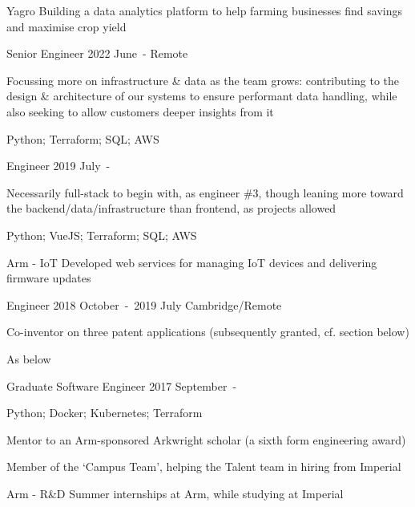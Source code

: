 \begin{cventries}

\cventryjob
  {Yagro}
  {Building a data analytics platform to help farming businesses find savings and maximise crop yield}

\cventryrole
  {Senior Engineer}
  {2022 June~-}
  {Remote}
  {\begin{cvitems}
    \item {Focussing more on infrastructure \& data as the team grows: contributing to the design \& architecture of our systems to ensure performant data handling, while also seeking to allow customers deeper insights from it}
    \item {Python; Terraform; SQL; AWS}
  \end{cvitems}}

\cventryrole
  {Engineer}
  {2019 July~-}
  {}
  {\begin{cvitems}
    \item {Necessarily full-stack to begin with, as engineer \#3, though leaning more toward the backend/data/infrastructure than frontend, as projects allowed}
    \item {Python; VueJS; Terraform; SQL; AWS}
  \end{cvitems}}

\cventryjob
  {Arm - IoT}
  {Developed web services for managing IoT devices and delivering firmware updates}

\cventryrole
  {Engineer}
  {2018 October~-~2019 July}
  {Cambridge/Remote}
  {\begin{cvitems}
    \item {Co-inventor on three patent applications (subsequently granted, cf. section below)}
    \item {As below}
  \end{cvitems}}

\cventryrole
  {Graduate Software Engineer}
  {2017 September~-}
  {}
  {\begin{cvitems}
    \item {Python; Docker; Kubernetes; Terraform}
    \item {Mentor to an Arm-sponsored Arkwright scholar (a sixth form engineering award)}
    \item {Member of the `Campus Team', helping the Talent team in hiring from Imperial}
  \end{cvitems}}

\cventryjob
  {Arm - R\&D}
  {Summer internships at Arm, while studying at Imperial}


\end{cventries}
